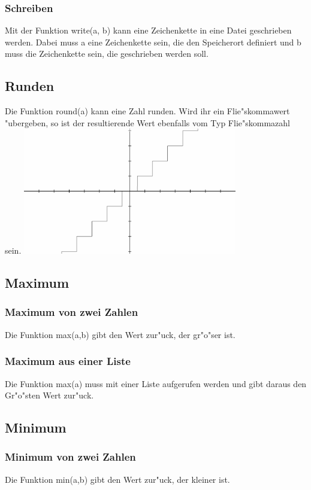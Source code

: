 \documentclass{scrartcl}
\begin{document}
\subsubsection{Schreiben}
Mit der Funktion write(a, b) kann eine Zeichenkette in eine Datei geschrieben werden. Dabei muss a eine Zeichenkette sein, die den Speicherort definiert und b muss die Zeichenkette sein, die geschrieben werden soll.
\subsection{Runden}
\label{chp:Runden}
Die Funktion round(a) kann eine Zahl runden. Wird ihr ein Flie"skommawert "ubergeben, so ist der resultierende Wert ebenfalls vom Typ Flie"skommazahl sein.\newline
\includegraphics[width=0.7\textwidth]{images/functions/round.png}
\subsection{Maximum}
\subsubsection{Maximum von zwei Zahlen}
Die Funktion max(a,b) gibt den Wert zur"uck, der gr"o"ser ist.
\subsubsection{Maximum aus einer Liste}
Die Funktion max(a) muss mit einer Liste aufgerufen werden und gibt daraus den Gr"o"sten Wert zur"uck.
\subsection{Minimum}
\subsubsection{Minimum von zwei Zahlen}
Die Funktion min(a,b) gibt den Wert zur"uck, der kleiner ist.
\end{document}
